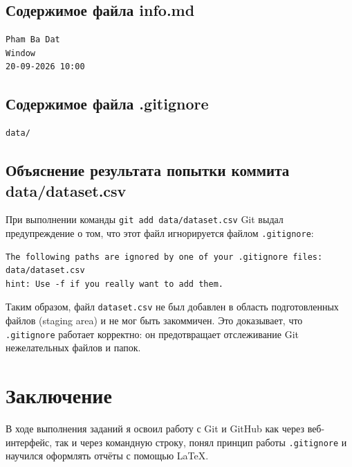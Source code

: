 \documentclass[a4paper, 12pt]{article}
\begin{document}
\subsection{Содержимое файла info.md}
\begin{verbatim}
Pham Ba Dat
Window
20-09-2026 10:00
\end{verbatim}

\subsection{Содержимое файла .gitignore}
\begin{verbatim}
data/
\end{verbatim}

\subsection{Объяснение результата попытки коммита data/dataset.csv}
При выполнении команды \texttt{git add data/dataset.csv} Git выдал предупреждение
о том, что этот файл игнорируется файлом \texttt{.gitignore}:

\begin{verbatim}
The following paths are ignored by one of your .gitignore files:
data/dataset.csv
hint: Use -f if you really want to add them.
\end{verbatim}

Таким образом, файл \texttt{dataset.csv} не был добавлен в область подготовленных
файлов (staging area) и не мог быть закоммичен. Это доказывает, что
\texttt{.gitignore} работает корректно: он предотвращает отслеживание Git
нежелательных файлов и папок.

\section{Заключение}
В ходе выполнения заданий я освоил работу с Git и GitHub как через веб-интерфейс,
так и через командную строку, понял принцип работы \texttt{.gitignore}
и научился оформлять отчёты с помощью LaTeX.
\end{document}
